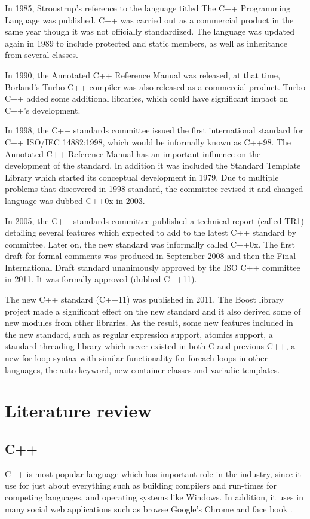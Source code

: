 \documentclass[11pt]{report}
\begin{document}
In 1985, Stroustrup's reference to the language titled The C++ Programming Language was published. C++ was carried out as a commercial product in the same year though it was not officially standardized. The language was updated again in 1989 to include protected and static members, as well as inheritance from several classes\cite{StroustrupHistory}.

In 1990, the Annotated C++ Reference Manual was released, at that time, Borland's Turbo C++ compiler was also released as a commercial product. Turbo C++ added some additional libraries, which could have significant impact on C++'s development\cite{StroustrupHistory}.

In 1998, the C++ standards committee issued the first international standard for C++ ISO/IEC 14882:1998, which would be informally known as C++98. The Annotated C++ Reference Manual has an important influence on the development of the standard.  In addition it was included the Standard Template Library which started its conceptual development in 1979. Due to multiple problems that discovered in 1998 standard, the committee revised it and changed language was dubbed C++0x in 2003\cite{CplusplusHistoryofCpp}.

In 2005, the C++ standards committee published a technical report (called TR1) detailing several features which expected to add to the latest C++ standard by committee. Later on, the new standard was informally called C++0x.  The first draft for formal comments was produced in September 2008 and then the Final International Draft standard unanimously approved by the ISO C++ committee in 2011. It was formally approved (dubbed C++11)\cite{CplusplusHistoryofCpp}.

The new C++ standard (C++11) was published in 2011. The Boost library project made a significant effect on the new standard and it also derived some of new modules from other libraries. As the result, some new features included in the new standard, such as regular expression support, atomics support, a standard threading library which never existed in both C and previous C++, a new for loop syntax with similar functionality for foreach loops in other languages, the auto keyword, new container classes and variadic templates\cite{CplusplusHistoryofCpp}. 


\chapter{Literature review}

\section{C++}
\label{section: C++}
C++ is most popular language which has important role in the industry, since it use for just about everything such as building compilers and run-times for competing languages, and operating systems like Windows. In addition, it uses in many social web applications such as browse Google’s Chrome and face book \cite{ISO:2011:Cpplanguage}.
\end{document}
